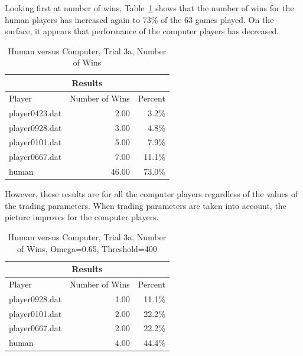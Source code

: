 Looking first at number of wins, Table~\ref{tab:human_results3a} shows that the
number of wins for the human players has increased again to 73\% of the 63 games
played. On the surface, it appears that performance of the computer players has
decreased.

\begin{table}[htbp]
  \centering
  \caption{Human versus Computer, Trial 3a, Number of Wins}
    \begin{tabular}{lrr}
    \toprule
    \multicolumn{3}{c}{Results}  \\
    \midrule
    Player & Number of Wins & Percent \\
    \multicolumn{1}{l}{player0423.dat} & 2.00   & 3.2\% \\
    \multicolumn{1}{l}{player0928.dat} & 3.00   & 4.8\% \\
    \multicolumn{1}{l}{player0101.dat} & 5.00   & 7.9\% \\
    \multicolumn{1}{l}{player0667.dat} & 7.00   & 11.1\% \\
    \multicolumn{1}{l}{human} & 46.00  & 73.0\% \\
    \bottomrule
    \end{tabular}%
  \label{tab:human_results3a}%
\end{table}%

However, these results are for all the computer players regardless of the values
of the trading parameters. When trading parameters are taken into account, the
picture improves for the computer players.

\begin{table}[htbp]
  \centering
  \caption{Human versus Computer, Trial 3a, Number of Wins, Omega=0.65, Threshold=400}
    \begin{tabular}{lrr}
    \toprule
    \multicolumn{3}{c}{Results}  \\
    \midrule
    Player & Number of Wins & Percent \\
    \multicolumn{1}{l}{player0928.dat} & 1.00   & 11.1\% \\
    \multicolumn{1}{l}{player0101.dat} & 2.00   & 22.2\% \\
    \multicolumn{1}{l}{player0667.dat} & 2.00   & 22.2\% \\
    \multicolumn{1}{l}{human} & 4.00   & 44.4\% \\
    \bottomrule
    \end{tabular}%
  \label{tab:human_results3b}%
\end{table}%

